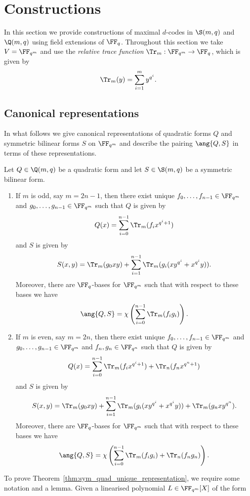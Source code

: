 \section{Constructions}
\label{sec:Constructions}

In this section we provide constructions of maximal $d$-codes in $\S(m,q)$ and $\Q(m,q)$ using field extensions of $\FF_q$. Throughout this section we take $V=\FF_{q^m}$ and use the \emph{relative trace function} $\Tr_m:\FF_{q^m}\to\FF_q$, which is given by
\[
\Tr_m(y)=\sum_{i=1}^my^{q^i}.
\]

\subsection{Canonical representations}

In what follows we give canonical representations of quadratic forms $Q$ and symmetric bilinear forms $S$ on $\FF_{q^m}$ and describe the pairing $\ang{Q,S}$ in terms of these representations.
\begin{theorem}
\label{thm:sym_quad_unique_representation}
Let $Q\in\Q(m,q)$ be a quadratic form and let $S\in\S(m,q)$ be a symmetric bilinear form.
\begin{enumerate}
\item If $m$ is odd, say $m=2n-1$, then there exist unique $f_0,\dots,f_{n-1}\in\FF_{q^m}$ and $g_0,\dots,g_{n-1}\in\FF_{q^m}$ such that $Q$ is given by
\[
Q(x)=\sum_{i=0}^{n-1}\Tr_m(f_ix^{q^i+1})
\]
and $S$ is given by
\[
S(x,y)=\Tr_m(g_0xy)+\sum_{i=1}^{n-1}\Tr_m(g_i(xy^{q^i}+x^{q^i}y)).
\]
Moreover, there are $\FF_q$-bases for $\FF_{q^m}$ such that with respect to these bases we have
\[
\ang{Q,S}=\chi\left(\sum\limits_{i=0}^{n-1}\Tr_m(f_ig_i)\right).
\]

\item If $m$ is even, say $m=2n$, then there exist unique $f_0,\dots,f_{n-1}\in\FF_{q^m}$ and $g_0,\dots,g_{n-1}\in\FF_{q^m}$ and $f_n,g_n\in\FF_{q^n}$ such that $Q$ is given by
\[
Q(x)=\sum_{i=0}^{n-1}\Tr_m(f_ix^{q^i+1})+\Tr_n(f_nx^{q^n+1})
\]
and $S$ is given by
\[
S(x,y)=\Tr_m(g_0xy)+\sum_{i=1}^{n-1}\Tr_m(g_i(xy^{q^i}+x^{q^i}y))+\Tr_m(g_nxy^{q^n}).
\]
Moreover, there are $\FF_q$-bases for $\FF_{q^m}$ such that with respect to these bases we have
\[
\ang{Q,S}=\chi\left(\sum\limits_{i=0}^{n-1}\Tr_m(f_ig_i)+\Tr_n(f_ng_n)\right).
\]
\end{enumerate}
\end{theorem}
\par
To prove Theorem~\ref{thm:sym_quad_unique_representation}, we require some notation and a lemma. Given a linearised polynomial $L\in\FF_{q^m}[X]$ of the form

